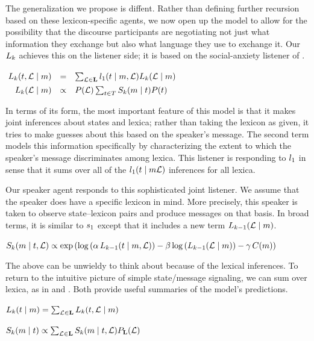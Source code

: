 \documentclass{article}
\begin{document}
The generalization we propose is diffent. Rather than defining further
recursion based on these lexicon-specific agents, we now open up the
model to allow for the possibility that the discourse participants are
negotiating not just what information they exchange but also what
language they use to exchange it. Our $\ListenerK$ achieves this on
the listener side; it is based on the social-anxiety listener of
\citet{Smith:Goodman:Frank:2013}.
%
\begin{examples}
  \item\label{Lk}%
    \setlength{\arraycolsep}{2pt}%
    $\mspace{-4mu}\begin{array}[t]{r c l}
      \ListenerK(\state, \Lex \given \msg) 
      &=&
      \sum_{\Lex \in \LexSet} \listenerOne(\state \given \msg, \Lex) \ListenerK(\Lex \given \msg) 
      \\[1ex]
      \ListenerK(\Lex \given \msg) 
      &\propto& 
      \Prior(\Lex) \sum_{\state\in\States} \SpeakerK(\msg \given \state)\Prior(\state)
    \end{array}$
\end{examples}
%
In terms of its form, the most important feature of this model is that
it makes joint inferences about states and lexica; rather than taking
the lexicon as given, it tries to make guesses about this based on the
speaker's message. The second term models this information
specifically by characterizing the extent to which the speaker's
message discriminates among lexica. This listener is responding to
$\listenerOne$ in sense that it sums over all of the
$\listenerOne(\state\given\msg\Lex)$ inferences for all lexica.
  
Our speaker agent responds to this sophisticated joint listener.  We
assume that the speaker does have a specific lexicon in mind.  More
precisely, this speaker is taken to observe state--lexicon pairs and
produce messages on that basis. In broad terms, it is similar to
$\speakerOne$ except that it includes a new term
$\ListenerK[k-1](\Lex\given\msg)$.

\begin{examples}  
  \item\label{Sk}%
    $\SpeakerK(\msg \given \state, \Lex) \propto 
    \exp
    \left(
      \log
      \left(\alpha\,\ListenerK[k-1](\state \given \msg, \Lex)\right)
      - 
      \beta \log\left(\ListenerK[k-1](\Lex\given\msg)\right)
      -
      \gamma\,\Costs(\msg)
    \right)$
\end{examples}


The above can be unwieldy to think about because of the lexical
inferences. To return to the intuitive picture of simple
state/message signaling, we can sum over lexica, as in 
 and . Both provide useful summaries
of the model's predictions.
%
\begin{examples}
\item\label{lisnorm}%
  $\ListenerK(\state \given \msg)  = 
  \sum_{\Lex \in \LexSet} \ListenerK(\state, \Lex \given \msg)$
\item\label{spknorm}%
  $\SpeakerK(\msg \given \state) \propto 
  \sum_{\Lex \in \LexSet} \SpeakerK(\msg \given \state, \Lex)
  \LexPrior(\Lex)$
\end{examples}
\end{document}
